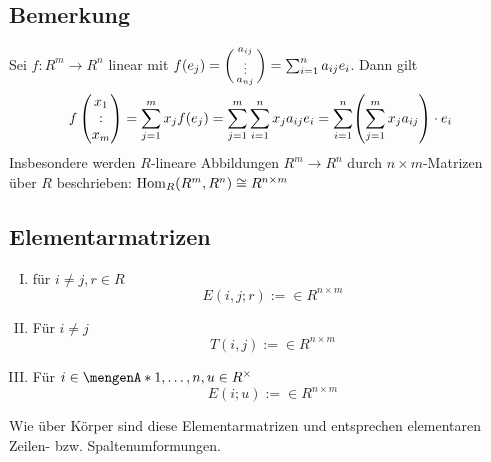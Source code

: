 \subsection{Bemerkung} %
\label{sub:1419}
Sei $f : R^m  \to R^n$ linear mit $f(e_j) = \enbrace*{\begin{smallmatrix}
	a_{ij} \\ \vdots \\ a_{nj}
\end{smallmatrix}} = \sum_{i=1}^{n} a_{ij} e_i$. Dann gilt 
\[
	f \begin{pmatrix}
		x_1 \\ : \\ x_m
	\end{pmatrix} = \sum_{j=1}^{m} x_j f(e_j) = \sum_{j=1}^{m} \sum_{i=1}^{n} x_j a_{ij} e_i = \sum_{i=1}^{n}  \enbrace*{\sum_{j=1}^{m} x_j a_{ij} } \cdot e_i 
\]
Insbesondere werden $R$-lineare Abbildungen $R^m \to R^n$ durch $n \times m$-Matrizen über $R$ beschrieben: $\Hom_R(R^m, R^n) \cong R^{n \times m}$

\subsection{Elementarmatrizen} %
\label{sub:1420}
\begin{enumerate}[I)]
	\item für $i \not= j, r \in R$ 
	\[
		E(i,j;r) := \in R^{n \times m}
	\]
	\item Für $i\not= j$
	\[
		T(i,j) := \in R^{n \times m}
	\]
	\item Für $i \in \set{1, \ldots , n}, u \in R^\times $
	\[
		E(i;u) := \in R^{n \times m}
	\]
\end{enumerate}
Wie über Körper sind diese Elementarmatrizen  und entsprechen elementaren Zeilen- bzw. Spaltenumformungen. 

